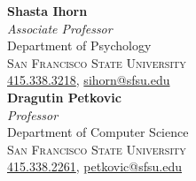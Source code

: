 \documentclass[hidelinks, 10.5pt]{article}
\def\contentwidth{0.9\linewidth}    %
\def\contentblockspacing{2.5mm}     %
\renewcommand{\section}[1]{
    {\fontsize{14}{14}\selectfont \textsc{\textbf{\ \ #1\ \ }}}\hrulefill
}
\begin{document}
{\begin{minipage}[ct]{\contentwidth}
\begin{multicols}{2}
        \vspace{-1mm}

        \textbf{Shasta Ihorn}\\
        \emph{Associate Professor}\\
        {Department of Psychology}\\
        \textsc{San Francisco State University}\\
        \href{tel:4153383218}{415.338.3218}, \href{mailto:sihorn@sfsu.edu}{sihorn@sfsu.edu}\\

        \textbf{Dragutin Petkovic}\\
        \emph{Professor}\\
        {Department of Computer Science}\\
        \textsc{San Francisco State University}\\
        \href{tel:4153382261}{415.338.2261}, \href{mailto:petkovic@sfsu.edu}{petkovic@sfsu.edu}\\
    \end{multicols}
\end{minipage}











}
\end{document}
